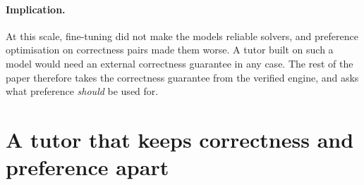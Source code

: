 \documentclass[11pt,a4paper]{article}
\begin{document}
\paragraph{Implication.}
At this scale, fine-tuning did not make the models reliable solvers, and preference
optimisation on correctness pairs made them worse. A tutor built on such a model would need
an external correctness guarantee in any case. The rest of the paper therefore takes the
correctness guarantee from the verified engine, and asks what preference \emph{should} be
used for.

\section{A tutor that keeps correctness and preference apart}
\label{sec:system}
\end{document}
